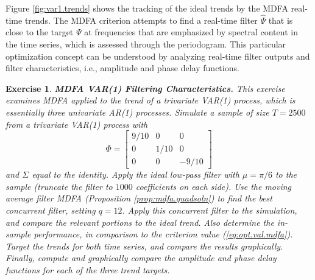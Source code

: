 \documentclass[a4paper]{book}
\newtheorem{Exercise}{Exercise}
\begin{document}
 Figure \ref{fig:var1.trends} shows the tracking of the ideal trends
 by the MDFA real-time trends.
The MDFA criterion  attempts to find a real-time filter $\widehat{\Psi}$
 that is close to the target $\Psi$ at frequencies that are emphasized
 by spectral content in the time series, which is assessed
 through the periodogram.   This particular 
optimization concept can be understood 
  by analyzing real-time filter outputs and filter 
  characteristics, i.e., amplitude and phase delay functions.


\begin{Exercise} {\bf MDFA VAR(1) Filtering Characteristics.} \rm
\label{exer:var1mdfa2.filter}
 This exercise examines MDFA applied to the trend of a trivariate VAR(1) process,
 which is essentially three univariate AR(1) processes.
Simulate a sample of size $T=2500$ from a
 trivariate VAR(1) process with 
\[
  \Phi = \left[ \begin{array}{ccc} 9/10 & 0 & 0 \\  0 & 1/10 & 0  \\ 0 & 0 & -9/10
   \end{array} \right]
\]
 and $\Sigma$ equal to the identity.   
  Apply the   ideal low-pass filter  with 
  $\mu = \pi/6$ to the sample (truncate the filter to $1000$ coefficients on each side).  
 Use the moving average filter
 MDFA  (Proposition \ref{prop:mdfa.quadsoln}) to find the best
 concurrent filter, setting $q= 12$.  Apply this concurrent filter 
 to the simulation, and compare the relevant portions to the ideal trend.
Also determine the in-sample performance, in comparison to the criterion value
 (\ref{eq:opt.val.mdfa}).
  Target the trends for both time series, and compare the results graphically.
 Finally, compute and graphically compare  the amplitude and phase delay
   functions for each of the three trend targets.
\end{Exercise}
\end{document}
